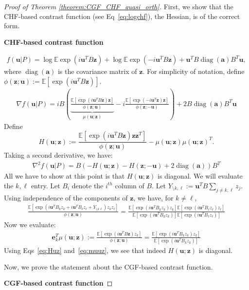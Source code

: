 \documentclass[letterpaper]{article}
\newcommand{\ba}[1]{\begin{align}#1\end{align}}
\newcommand{\bu}{\pmb{u}}
\newcommand{\be}{\pmb{e}}
\newcommand{\bz}{\pmb{z}}
\newcommand{\bvar}{\pmb{a}}
\newcommand{\E}{\mathbb{E}}
\newcommand{\bb}[1]{\left(#1\right)}
\newcommand{\bbb}[1]{\left[#1\right]}
\DeclareMathOperator{\diag}{diag}
\begin{document}
\begin{proof}[Proof of Theorem \ref{theorem:CGF_CHF_quasi_orth}]
First, we show that the CHF-based contrast function (see Eq~\ref{eq:logchf}), the Hessian, is of the correct form.

\textbf{CHF-based contrast function}

\begin{align*}
    f(\bu|P) = \log \E\exp(i\bu^TB\bz)+\log \E\exp(-i\bu^TB\bz)+\bu^TB\diag(\bvar)B^T\bu,
\end{align*}
where $\diag(\bvar)$ is the covariance matrix of $\bz$. For simplicity of notation, define $\phi(\bz;\bu):=\E\bbb{\exp(i\bu^TB\bz)}$.
\begin{align*}
    \nabla f(\bu|P)=iB\bb{\underbrace{\frac{\E\bbb{\exp(i\bu^TB\bz)\bz}}{\phi(\bz;\bu)}}_{\mu(\bu;\bz)}-i\frac{\E\bbb{\exp(-i\bu^T\bz)\bz}}{\phi(\bz;-\bu)}}+2B\diag(\bvar)B^T\bu
\end{align*}
Define
$$H(\bu;\bz):=\frac{\E\bbb{\exp(i\bu^TB\bz)\bz\bz^T}}{\phi(\bz;\bu)}-\mu(\bu;\bz)\mu(\bu;\bz)^T.$$
Taking a second derivative, we have:
\begin{align*}
    \nabla^2 f(\bu|P)=B\bb{-H(\bu;\bz)-H(\bz;-\bu)+2\diag(\bvar)}B^T
\end{align*} 
All we have to show at this point is that $H(\bu;\bz)$ is diagonal. We will evaluate the $k,\ell$ entry. Let $B_i$ denote the $i^{th}$ column of $B$. Let $Y_{\setminus k,\ell}:=\bu^TB\sum_{j\neq k,\ell}z_j$. Using independence of the components of $\bz$, we have, for $k\neq \ell$,
\ba{
    \label{eq:Huz}
    \frac{\E\bbb{\exp(i\bu^TB_kz_k+i\bu^TB_{\ell}z_{\ell}+Y_{\setminus k\ell})z_kz_{\ell}}}{\phi(\bz;\bu)}=\frac{\E\bbb{\exp(i\bu^TB_kz_k)z_k}\E\bbb{\exp(i\bu^TB_{\ell}z_{\ell})z_{\ell}}}{\E\bbb{\exp(i\bu^TB_kz_k)}\E\bbb{\exp(i\bu^TB_\ell z_\ell)}}
}
Now we evaluate:
\ba{
    \label{eq:muuz}
    \be_k^T\mu(\bu;\bz):=\frac{\E\bbb{\exp(i\bu^TB\bz)z_k}}{\phi(\bz;\bu)}=\frac{\E\bbb{\exp(i\bu^TB_k z_k)z_k}}{\E\bbb{\exp(i\bu^TB_k z_k)}}
}
Using Eqs~\ref{eq:Huz} and~\ref{eq:muuz}, we see that indeed $H(\bu;\bz)$ is diagonal.


Now, we prove the statement about the CGF-based contrast function. 

\textbf{CGF-based contrast function}


\end{proof}
\end{document}
